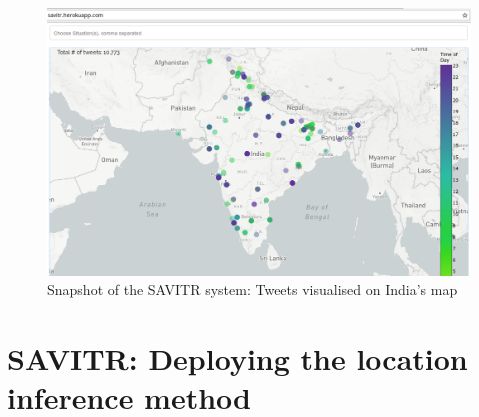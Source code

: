\begin{figure}[tb]
	\centering
		\includegraphics[scale=0.23]{map_general}
		\caption{Snapshot of the SAVITR system: Tweets visualised on India's map}
		\label{fig:map_general}
	\vspace*{-5mm}
\end{figure}


\section{SAVITR: Deploying the location inference method}

